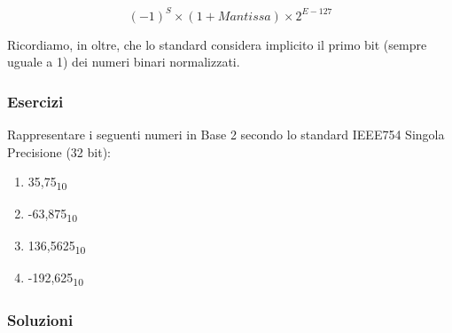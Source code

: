 \documentclass{article}
\begin{document}
$$(-1)^{S} \times (1+Mantissa) \times 2^{E-127}$$

Ricordiamo, in oltre, che lo standard considera implicito il primo bit (sempre uguale a 1) dei numeri binari normalizzati.

\subsubsection{Esercizi}
Rappresentare i seguenti numeri in Base 2 secondo lo standard IEEE754 Singola Precisione (32 bit):
\begin{enumerate}
    \item 35,75\textsubscript{10}
    \item -63,875\textsubscript{10}
    \item 136,5625\textsubscript{10}
    \item -192,625\textsubscript{10}
\end{enumerate}

\subsubsection{Soluzioni}
\end{document}
